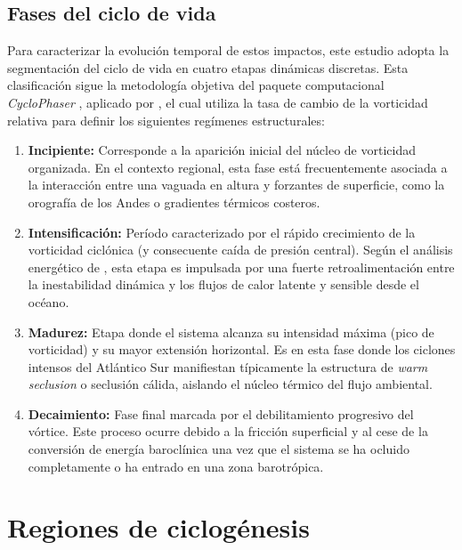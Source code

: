 \subsection{Fases del ciclo de vida}\label{subsec:mt_fases}

Para caracterizar la evolución temporal de estos impactos, este estudio adopta la segmentación del ciclo de vida en cuatro etapas dinámicas discretas. Esta clasificación sigue la metodología objetiva del paquete computacional \textit{CycloPhaser} \citep{deSouza2025CycloPhaser}, aplicado por \citet{coutodesouza2024new}, el cual utiliza la tasa de cambio de la vorticidad relativa para definir los siguientes regímenes estructurales:

\begin{enumerate}
    \item \textbf{Incipiente:} Corresponde a la aparición inicial del núcleo de vorticidad organizada. En el contexto regional, esta fase está frecuentemente asociada a la interacción entre una vaguada en altura y forzantes de superficie, como la orografía de los Andes o gradientes térmicos costeros.
    
    \item \textbf{Intensificación:} Período caracterizado por el rápido crecimiento de la vorticidad ciclónica (y consecuente caída de presión central). Según el análisis energético de \citet{coutodesouza2024thesis}, esta etapa es impulsada por una fuerte retroalimentación entre la inestabilidad dinámica y los flujos de calor latente y sensible desde el océano.
    
    \item \textbf{Madurez:} Etapa donde el sistema alcanza su intensidad máxima (pico de vorticidad) y su mayor extensión horizontal. Es en esta fase donde los ciclones intensos del Atlántico Sur manifiestan típicamente la estructura de \textit{warm seclusion} o seclusión cálida, aislando el núcleo térmico del flujo ambiental.
    
    \item \textbf{Decaimiento:} Fase final marcada por el debilitamiento progresivo del vórtice. Este proceso ocurre debido a la fricción superficial y al cese de la conversión de energía baroclínica una vez que el sistema se ha ocluido completamente o ha entrado en una zona barotrópica.
\end{enumerate}
\section{Regiones de ciclogénesis}\label{sec:mt_regiones}

